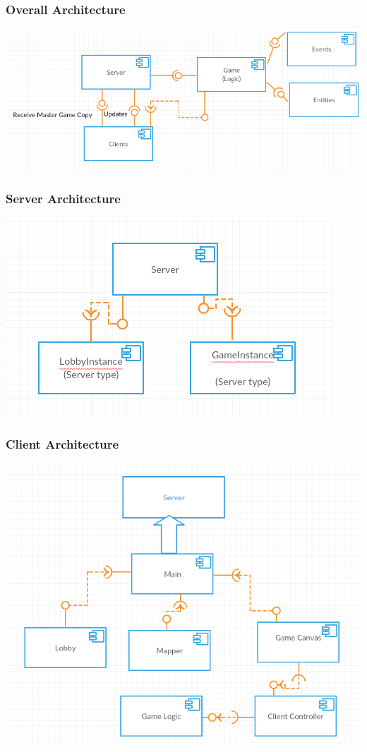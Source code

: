\documentclass{beamer}
\begin{document}
\begin{frame}
\frametitle{Overall Architecture}
\includegraphics[scale=0.4]{images/overall_architecture.png}
\end{frame}

\begin{frame}
\frametitle{Server Architecture}
\includegraphics[scale=0.7]{images/ServerArchitecture.png}
\end{frame}

\begin{frame}
\frametitle{Client Architecture}
\includegraphics[scale=0.4]{images/ClientArchitecture.png}
\end{frame}
\end{document}
